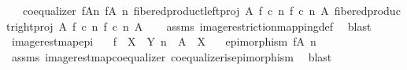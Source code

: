 \begin{isabellebody}
\ \ \ {\isachardoublequoteopen}coequalizer\ {\isacharparenleft}{\kern0pt}f{\isasymlparr}A{\isasymrparr}\isactrlbsub n\isactrlesub {\isacharparenright}{\kern0pt}\ {\isacharparenleft}{\kern0pt}f{\isasymrestriction}\isactrlbsub {\isacharparenleft}{\kern0pt}A{\isacharcomma}{\kern0pt}\ n{\isacharparenright}{\kern0pt}\isactrlesub {\isacharparenright}{\kern0pt}\ {\isacharparenleft}{\kern0pt}fibered{\isacharunderscore}{\kern0pt}product{\isacharunderscore}{\kern0pt}left{\isacharunderscore}{\kern0pt}proj\ A\ {\isacharparenleft}{\kern0pt}f\ {\isasymcirc}\isactrlsub c\ n{\isacharparenright}{\kern0pt}\ {\isacharparenleft}{\kern0pt}f\ {\isasymcirc}\isactrlsub c\ n{\isacharparenright}{\kern0pt}\ A{\isacharparenright}{\kern0pt}\ {\isacharparenleft}{\kern0pt}fibered{\isacharunderscore}{\kern0pt}product{\isacharunderscore}{\kern0pt}right{\isacharunderscore}{\kern0pt}proj\ A\ {\isacharparenleft}{\kern0pt}f\ {\isasymcirc}\isactrlsub c\ n{\isacharparenright}{\kern0pt}\ {\isacharparenleft}{\kern0pt}f\ {\isasymcirc}\isactrlsub c\ n{\isacharparenright}{\kern0pt}\ A{\isacharparenright}{\kern0pt}{\isachardoublequoteclose}\isanewline
%
\isadelimproof
\ \ %
\endisadelimproof
%
\isatagproof
{}\isamarkupfalse%
\ assms\ image{\isacharunderscore}{\kern0pt}restriction{\isacharunderscore}{\kern0pt}mapping{\isacharunderscore}{\kern0pt}def{}\ \isamarkupfalse%
\ blast%
\endisatagproof
{\isafoldproof}%
%
\isadelimproof
\isanewline
%
\endisadelimproof
\isanewline
{}\isamarkupfalse%
\ image{\isacharunderscore}{\kern0pt}rest{\isacharunderscore}{\kern0pt}map{\isacharunderscore}{\kern0pt}epi{\isacharcolon}{\kern0pt}\isanewline
\ \ \ {\isachardoublequoteopen}f\ {\isacharcolon}{\kern0pt}\ X\ {\isasymrightarrow}\ Y{\isachardoublequoteclose}\ {\isachardoublequoteopen}n\ {\isacharcolon}{\kern0pt}\ A\ {\isasymrightarrow}\ X{\isachardoublequoteclose}\isanewline
\ \ \ {\isachardoublequoteopen}epimorphism\ {\isacharparenleft}{\kern0pt}f{\isasymrestriction}\isactrlbsub {\isacharparenleft}{\kern0pt}A{\isacharcomma}{\kern0pt}\ n{\isacharparenright}{\kern0pt}\isactrlesub {\isacharparenright}{\kern0pt}{\isachardoublequoteclose}\isanewline
%
\isadelimproof
\ \ %
\endisadelimproof
%
\isatagproof
{}\isamarkupfalse%
\ assms\ image{\isacharunderscore}{\kern0pt}rest{\isacharunderscore}{\kern0pt}map{\isacharunderscore}{\kern0pt}coequalizer\ coequalizer{\isacharunderscore}{\kern0pt}is{\isacharunderscore}{\kern0pt}epimorphism\ \isamarkupfalse%
\ blast%
\endisatagproof
{\isafoldproof}%

\end{isabellebody}
